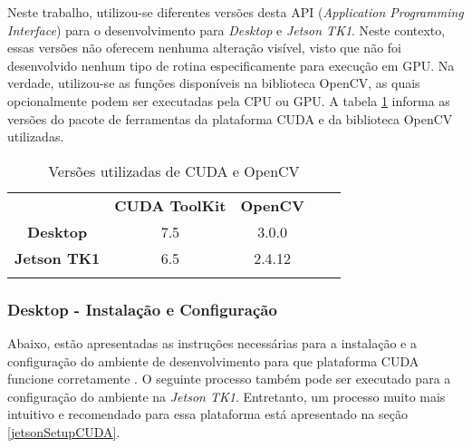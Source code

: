 Neste trabalho, utilizou-se diferentes versões desta API (\textit{Application Programming Interface}) para o desenvolvimento para \textit{Desktop} e \textit{Jetson TK1}. Neste contexto, essas versões não oferecem nenhuma alteração visível, visto que não foi desenvolvido nenhum tipo de rotina especificamente para execução em GPU. Na verdade, utilizou-se as funções disponíveis na biblioteca OpenCV, as quais opcionalmente podem ser executadas pela CPU ou GPU. A tabela \ref{cudaopencv} informa as versões do pacote de ferramentas da plataforma CUDA e da biblioteca OpenCV utilizadas. 

\begin{table}[]
\centering
\caption{Versões utilizadas de CUDA e OpenCV}
\label{cudaopencv}
\begin{tabular}{cccll}
                     & \textbf{CUDA ToolKit}	     & \textbf{OpenCV} 	       &  &  \\
\textbf{Desktop}     & 7.5                           & 3.0.0                   &  &  \\
\textbf{Jetson TK1}  & 6.5                           & 2.4.12                  &  &  \\
\multicolumn{1}{l}{} & \multicolumn{1}{l}{}          & \multicolumn{1}{l}{}    &  & 
\end{tabular}
\end{table}

\subsubsection{Desktop - Instalação e Configuração}
Abaixo, estão apresentadas as instruções necessárias para a instalação e a configuração do ambiente de desenvolvimento para que plataforma CUDA funcione corretamente \cite{FacebookCUDA}. O seguinte processo também pode ser executado para a configuração do ambiente na \textit{Jetson TK1}. Entretanto, um processo muito mais intuitivo e recomendado para essa plataforma está apresentado na seção \ref{jetsonSetupCUDA}.

